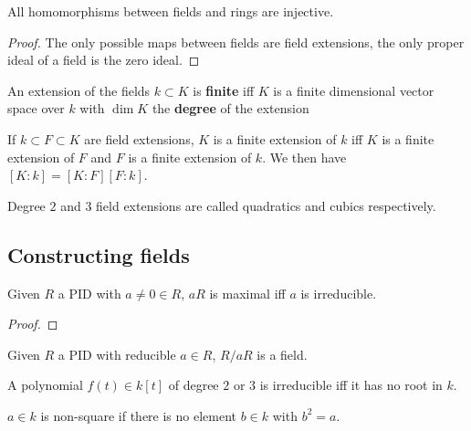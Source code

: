 \documentclass[../Year2.tex]{subfiles}
\begin{document}
\begin{proposition}
    All homomorphisms between fields and rings are injective.
    \begin{proof}
        The only possible maps between fields are field extensions, the only proper ideal of a field is the zero ideal.
    \end{proof}
\end{proposition}

\begin{definition}
    An extension of the fields $k\subset K$ is \textbf{finite} iff $K$ is a finite dimensional vector space over $k$ with $\dim K$ the \textbf{degree} of the extension
\end{definition}

\begin{theorem}
    If $k\subset F\subset K$ are field extensions, $K$ is a finite extension of $k$ iff $K$ is a finite extension of $F$ and $F$ is a finite extension of $k$. We then have $[K:k]=[K:F][F:k]$.
\end{theorem}

\begin{remark}
    Degree $2$ and $3$ field extensions are called quadratics and cubics respectively.
\end{remark}

\subsection{Constructing fields}

\begin{lemma}
    Given $R$ a PID with $a\neq0\in R$, $aR$ is maximal iff $a$ is irreducible.
    \begin{proof}
        
    \end{proof}
\end{lemma}

\begin{corollary}
    Given $R$ a PID with reducible $a\in R$, $R/aR$ is a field.
\end{corollary}

\begin{theorem}
    A polynomial $f(t)\in k[t]$ of degree $2$ or $3$ is irreducible iff it has no root in $k$.
\end{theorem}

\begin{definition}
    $a\in k$ is non-square if there is no element $b\in k$ with $b^2=a$.
\end{definition}
\end{document}
